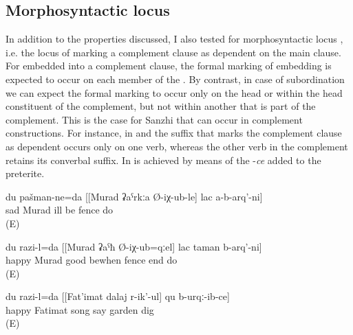 
\subsection{Morphosyntactic locus}
\label{ssec:Morphosyntactic locus}

In addition to the properties discussed, I also tested for morphosyntactic locus \citep{Kazenin.Testelets2004}, i.e. the locus of marking a complement clause as dependent on the main clause. For  embedded into a complement clause, the formal marking of embedding is expected to occur on each member of the . By contrast, in case of subordination we can expect the formal marking to occur only on the head or within the head constituent of the complement, but not within another  that is part of the complement. This is the case for Sanzhi  that can occur in complement constructions. For instance, in  and  the  suffix that marks the complement clause as dependent occurs only on one verb, whereas the other verb in the complement retains its converbal suffix. In   is achieved by means of the  -\textit{ce} added to the preterite.
%
\begin{exe}
	\ex	\label{ex:‎‎‎I am sad because Murad got ill and did not build the fence4}
	\gll	du	pašman-ne=da [[Murad	ʡaˁrkːa	Ø-iχ-ub-le]	lac	a-b-arq'-ni]\\
			sad	Murad	ill	be	fence	do\\
	\glt	{} (E)

	\ex	\label{ex:‎I am happy when Murad got healthy and finished building the fence5}
	\gll	du	razi-l=da	[[Murad	ʡaˁħ	Ø-iχ-ub=qːel]	lac	taman	b-arq'-ni]\\
			happy	Murad	good	bewhen	fence	end	do\\
	\glt	{} (E)

	\ex	\label{ex:‎I am happy that Fatimat dug the field while singing a song}
	\gll	du	razi-l=da	[[Fat'imat	dalaj	r-ik'-ul]	qu	b-urqː-ib-ce]\\
			happy	Fatimat	song	say	garden	dig\\
	\glt	{} (E)
\end{exe}


